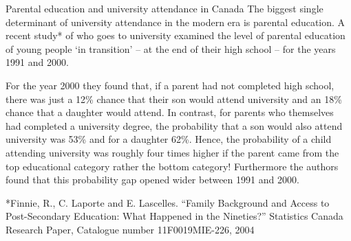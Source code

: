 \begin{ApplicationBox}{Parental education and  university attendance in Canada \label{app:parentedcanada}}
The biggest single determinant of university attendance in the modern era is parental education. A recent study* of who goes to university examined the level of parental education of young people `in transition' -- at the end of their high school -- for the years 1991 and 2000. 

\bigskip
For the year 2000 they found that, if a parent had not completed high school, there was just a 12\% chance that their son would attend university and an 18\% chance that a daughter would attend.  In contrast, for parents who themselves had completed a university degree, the probability that a son would also attend university was 53\% and for a daughter 62\%. Hence, the probability of a child attending university was roughly four times higher if the parent came from the top educational category rather the bottom category! Furthermore the authors found that this probability gap opened wider between 1991 and 2000.

\bigskip
*Finnie, R., C. Laporte and E. Lascelles. ``Family Background and Access to Post-Secondary Education: What Happened in the Nineties?'' Statistics Canada Research Paper, Catalogue number 11F0019MIE-226, 2004
\end{ApplicationBox}